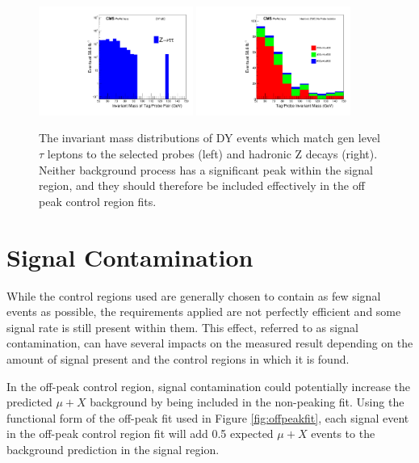 \begin{figure}[htp]
    \centering
    \includegraphics[width=0.45\textwidth]{figures/tauZInvMass.pdf}
    \includegraphics[width=0.45\textwidth]{figures/hadronZInvMass.pdf}
     \caption[The invariant mass of hadronic and $\tau$ Z decays]{The invariant mass distributions of DY events which match gen level $\tau$ leptons to the selected probes (left) and hadronic Z decays (right). Neither background process has a significant peak within the signal region, and they should therefore be included effectively in the off peak control region fits.}
    \label{fig:ZtoTauTau}
\end{figure}

\section{Signal Contamination}
\label{sec:SigContamination}
While the control regions used are generally chosen to contain as few signal events as possible, the requirements applied are not perfectly efficient and some signal rate is still present within them.
This effect, referred to as signal contamination, can have several impacts on the measured result depending on the amount of signal present and the control regions in which it is found.

In the off-peak control region, signal contamination could potentially increase the predicted $\mu+X$ background by being included in the non-peaking fit. 
Using the functional form of the off-peak fit used in Figure \ref{fig:offpeakfit}, each signal event in the off-peak control region fit will add 0.5 expected $\mu+X$ events to the background prediction in the signal region.

